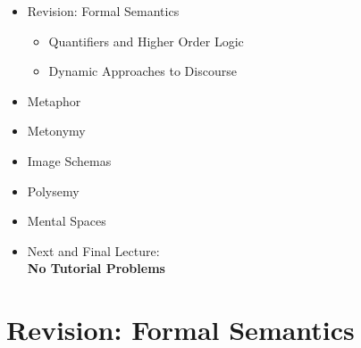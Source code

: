 \documentclass[headrule,footrule]{foils}
\begin{document}
\maketitle

%

\begin{itemize}\addtolength{\itemsep}{-2ex}
\item Revision: Formal Semantics
\begin{itemize}
  \item Quantifiers and Higher Order Logic
  \item Dynamic Approaches to Discourse
  \end{itemize}
\item Metaphor
\item Metonymy
\item Image Schemas
\item Polysemy
\item Mental Spaces
\item Next and Final Lecture:  
\\ \textbf{No Tutorial Problems}
\end{itemize}

 

%




\section{Revision: Formal Semantics}

\end{document}
